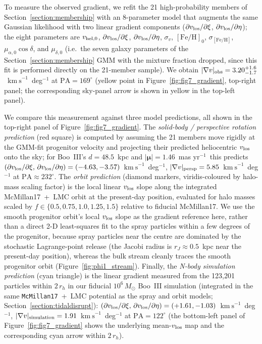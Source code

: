 \documentclass[twocolumn]{aastex631}
\newcommand{\vlosUnits}{$\mathrm{km~s}^{-1}$\xspace}
\newcommand{\pmUnits}{mas yr$^{-1}$\xspace}
\begin{document}
To measure the observed gradient, we refit the 21 high-probability members of Section~\ref{section:membership} with an 8-parameter model that augments the same Gaussian likelihood with two linear gradient components ($\partial v_{\rm los}/\partial\xi$, $\partial v_{\rm los}/\partial\eta$); the eight parameters are $v_{\rm hel,0}$, $\partial v_{\rm los}/\partial\xi$, $\partial v_{\rm los}/\partial\eta$, $\sigma_v$, $[\mathrm{Fe/H}]_0$, $\sigma_{[\mathrm{Fe/H}]}$, $\mu_{\alpha,0}\cos\delta$, and $\mu_{\delta,0}$ (i.e.\ the seven galaxy parameters of the Section~\ref{section:membership} GMM with the mixture fraction dropped, since this fit is performed directly on the 21-member sample). We obtain $|\nabla v|_{\rm obs} = 3.20^{+1.6}_{-1.7}$~\vlosUnits~deg$^{-1}$ at $\mathrm{PA} = 169^\circ$ (yellow point in Figure~\ref{fig:fig7_gradient}, top-right panel; the corresponding sky-panel arrow is shown in yellow in the top-left panel).

We compare this measurement against three model predictions, all shown in the top-right panel of Figure~\ref{fig:fig7_gradient}. The \emph{solid-body / perspective rotation prediction} (red square) is computed by assuming the 21 members move rigidly at the GMM-fit progenitor velocity and projecting their predicted heliocentric $v_{\rm los}$ onto the sky; for Boo~III's $d = 48.5$~kpc and $|\boldsymbol{\mu}| = 1.46$~\pmUnits\ this predicts $(\partial v_{\rm los}/\partial\xi,\,\partial v_{\rm los}/\partial\eta) = (-4.63, -3.57)$~\vlosUnits~deg$^{-1}$, $|\nabla v|_{\rm persp} = 5.85$~\vlosUnits~deg$^{-1}$ at $\mathrm{PA} \approx 232^\circ$. The \emph{orbit prediction} (diamond markers, viridis-coloured by halo-mass scaling factor) is the local linear $v_{\rm los}$ slope along the integrated McMillan17~+~LMC orbit at the present-day position, evaluated for halo masses scaled by $f \in \{0.5, 0.75, 1.0, 1.25, 1.5\}$ relative to fiducial McMillan17. We use the smooth progenitor orbit's local $v_{\rm los}$ slope as the gradient reference here, rather than a direct 2-D least-squares fit to the spray particles within a few degrees of the progenitor, because spray particles near the centre are dominated by the stochastic Lagrange-point release (the Jacobi radius is $r_J \approx 0.5$~kpc near the present-day position), whereas the bulk stream cleanly traces the smooth progenitor orbit (Figure~\ref{fig:phi1_stream}). Finally, the \emph{N-body simulation prediction} (cyan triangle) is the linear gradient measured from the 123{,}201 particles within $2\,r_h$ in our fiducial $10^6\,M_\odot$ Boo~III simulation (integrated in the same \texttt{McMillan17}~+~LMC potential as the spray and orbit models; Section~\ref{section:tidaldisrupt}): $(\partial v_{\rm los}/\partial\xi,\,\partial v_{\rm los}/\partial\eta) = (+1.61, -1.03)$~\vlosUnits~deg$^{-1}$, $|\nabla v|_{\rm simulation} = 1.91$~\vlosUnits~deg$^{-1}$ at $\mathrm{PA} = 122^\circ$ (the bottom-left panel of Figure~\ref{fig:fig7_gradient} shows the underlying mean-$v_{\rm los}$ map and the corresponding cyan arrow within $2\,r_h$).
\end{document}
